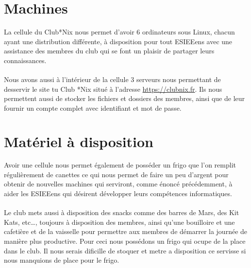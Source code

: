 \documentclass[11pt]{report}
\begin{document}
\section{Machines}

\paragraph{} La cellule du Club*Nix nous permet d'avoir 6 ordinateurs sous
Linux, chacun ayant une distribution différente, à disposition pour tout
ESIEEens avec une assistance des membres du club qui se font un plaisir de
partager leurs connaissances.

\paragraph{} Nous avons aussi à l'intérieur de la cellule 3 serveurs nous
permettant de desservir le site tu Club *Nix situé à l'adresse
\url{https://clubnix.fr}. Ils nous permettent aussi de stocker les fichiers et
dossiers des membres, ainsi que de leur fournir un compte complet avec
identifiant et mot de passe.



\section{Matériel à disposition}

\paragraph{} Avoir une cellule nous permet également de posséder un frigo que
l'on remplit régulièrement de canettes ce qui nous permet de faire un peu
d'argent pour obtenir de nouvelles machines qui serviront, comme énoncé
précédemment, à aider les ESIEEens qui désirent développer leurs compétences
informatiques.

\paragraph{} Le club mets aussi à disposition des snacks comme des barres de
Mars, des Kit Kats, etc\ldots, toujours à disposition des membres, ainsi qu'une
bouilloire et une cafetière et de la vaisselle pour permettre aux membres de
démarrer la journée de manière plus productive.
Pour ceci nous possédons un frigo qui ocupe de la place dans le club.
Il nous serais dificille de stoquer et metre a disposition ce servisse si nous manquions de place pour le frigo. 
\end{document}
